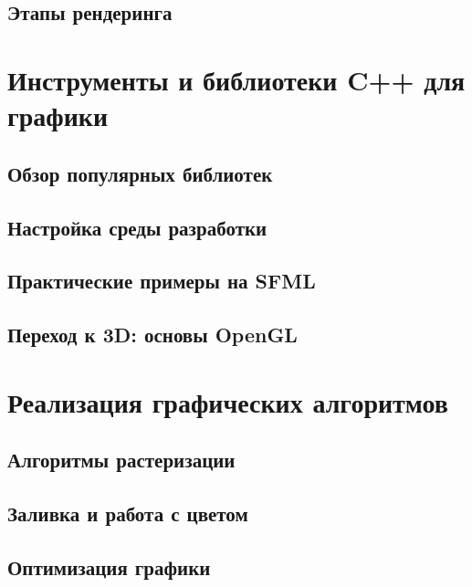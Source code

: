 \documentclass[referat]{SCWorks}
\begin{document}

\subsection{Этапы рендеринга}


\section{Инструменты и библиотеки C++ для графики}

\subsection{Обзор популярных библиотек}



\subsection{Настройка среды разработки}


\subsection{Практические примеры на SFML}

% 

\subsection{Переход к 3D: основы OpenGL}

% 

\section{Реализация графических алгоритмов}

\subsection{Алгоритмы растеризации}


\subsection{Заливка и работа с цветом}


\subsection{Оптимизация графики}


\conclusion






\appendix
\end{document}

